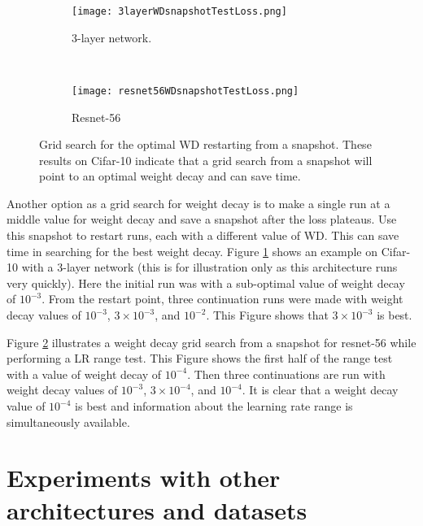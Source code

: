 \documentclass{article} %
\begin{document}
\begin{figure}[tbh]
	\centering
	\begin{subfigure}[b]{0.46\textwidth}
		\texttt{[image: 3layerWDsnapshotTestLoss.png]}
		\caption{3-layer network.}
		\label{fig:3layerWDsnapshotTestLoss}       %
	\end{subfigure}
	\quad
	\hfill
	~ %
	\centering
	\begin{subfigure}[b]{0.46\textwidth}
		\texttt{[image: resnet56WDsnapshotTestLoss.png]}
		\caption{Resnet-56}
		\label{fig:resnet56WDsnapshotTestLoss}       %
	\end{subfigure}
	\caption{Grid search for the optimal WD restarting from a snapshot.  These results on Cifar-10 indicate that a grid search from a snapshot will point to an optimal weight decay and can save time. }
	\label{fig:WDfromSnapshot}
	\vspace{-5pt}	
\end{figure}


Another option as a grid search for weight decay is to make a single run at a middle value for weight decay and save a snapshot after the loss plateaus.  Use this snapshot to restart runs, each with a different value of WD.  This can save  time in searching for the best weight decay.  Figure \ref{fig:3layerWDsnapshotTestLoss} shows an example on Cifar-10 with a 3-layer network (this is for illustration only as this architecture runs very quickly).  Here the initial run was with a sub-optimal value of weight decay of $10^{-3}$.  From the restart point, three continuation runs were made with weight decay values of $10^{-3}$, $3 \times 10^{-3}$, and $10^{-2}$. This Figure shows that $3 \times 10^{-3}$ is best.

Figure \ref{fig:resnet56WDsnapshotTestLoss} illustrates a weight decay grid search from a snapshot for resnet-56 while performing a LR range test.  This Figure shows the first half of the range test with a value of weight decay of $10^{-4}$.  Then three continuations are run with weight decay values of $10^{-3}$, $3 \times 10^{-4}$, and $10^{-4}$.  It is clear that a weight decay value of $10^{-4}$ is best and information about the learning rate range is simultaneously available.



\section{Experiments with other architectures and datasets}
\label{sec:other}
\end{document}
